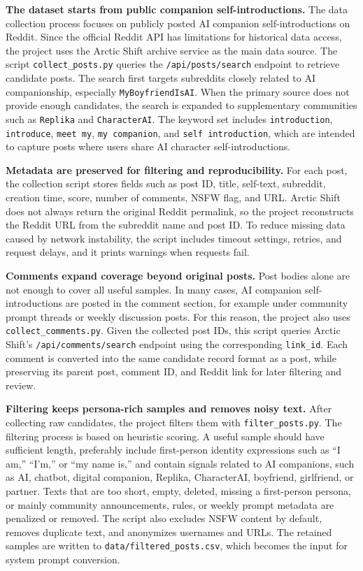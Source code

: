 \documentclass[12pt,a4paper]{article}
\begin{document}
\textbf{The dataset starts from public companion self-introductions.} The data collection process focuses on publicly posted AI companion self-introductions on Reddit. Since the official Reddit API has limitations for historical data access, the project uses the Arctic Shift archive service as the main data source. The script \texttt{collect\_posts.py} queries the \texttt{/api/posts/search} endpoint to retrieve candidate posts. The search first targets subreddits closely related to AI companionship, especially \texttt{MyBoyfriendIsAI}. When the primary source does not provide enough candidates, the search is expanded to supplementary communities such as \texttt{Replika} and \texttt{CharacterAI}. The keyword set includes \texttt{introduction}, \texttt{introduce}, \texttt{meet my}, \texttt{my companion}, and \texttt{self introduction}, which are intended to capture posts where users share AI character self-introductions.

\textbf{Metadata are preserved for filtering and reproducibility.} For each post, the collection script stores fields such as post ID, title, self-text, subreddit, creation time, score, number of comments, NSFW flag, and URL. Arctic Shift does not always return the original Reddit permalink, so the project reconstructs the Reddit URL from the subreddit name and post ID. To reduce missing data caused by network instability, the script includes timeout settings, retries, and request delays, and it prints warnings when requests fail.

\textbf{Comments expand coverage beyond original posts.} Post bodies alone are not enough to cover all useful samples. In many cases, AI companion self-introductions are posted in the comment section, for example under community prompt threads or weekly discussion posts. For this reason, the project also uses \texttt{collect\_comments.py}. Given the collected post IDs, this script queries Arctic Shift's \texttt{/api/comments/search} endpoint using the corresponding \texttt{link\_id}. Each comment is converted into the same candidate record format as a post, while preserving its parent post, comment ID, and Reddit link for later filtering and review.

\textbf{Filtering keeps persona-rich samples and removes noisy text.} After collecting raw candidates, the project filters them with \texttt{filter\_posts.py}. The filtering process is based on heuristic scoring. A useful sample should have sufficient length, preferably include first-person identity expressions such as ``I am,'' ``I'm,'' or ``my name is,'' and contain signals related to AI companions, such as AI, chatbot, digital companion, Replika, CharacterAI, boyfriend, girlfriend, or partner. Texts that are too short, empty, deleted, missing a first-person persona, or mainly community announcements, rules, or weekly prompt metadata are penalized or removed. The script also excludes NSFW content by default, removes duplicate text, and anonymizes usernames and URLs. The retained samples are written to \texttt{data/filtered\_posts.csv}, which becomes the input for system prompt conversion.
\end{document}
